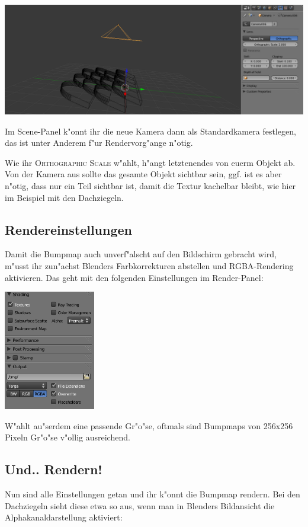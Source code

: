 \documentclass[a4paper]{article}
\newcommand{\ccaption}[1]{\textsc{#1}}
\begin{document}
\begin{center}
\includegraphics[width=150mm]{../images/blender/bumpmap-camera.png}
\end{center}

Im Scene-Panel k"onnt ihr die neue Kamera dann als Standardkamera festlegen, das ist unter Anderem f"ur Rendervorg"ange n"otig.

Wie ihr \ccaption{Orthographic Scale} w"ahlt, h"angt letztenendes von euerm Objekt ab. Von der Kamera aus sollte das gesamte Objekt sichtbar sein,
ggf. ist es aber n"otig, dass nur ein Teil sichtbar ist, damit die Textur kachelbar bleibt, wie hier im Beispiel mit den Dachziegeln.

\subsection{Rendereinstellungen}
Damit die Bumpmap auch unverf"alscht auf den Bildschirm gebracht wird, m"usst ihr zun"achst Blenders Farbkorrekturen abstellen und RGBA-Rendering
aktivieren. Das geht mit den folgenden Einstellungen im Render-Panel:

\begin{center}
\includegraphics[width=40mm]{../images/blender/bumpmap-render.png}
\end{center}

W"ahlt au"serdem eine passende Gr"o"se, oftmals sind Bumpmaps von 256x256 Pixeln Gr"o"se v"ollig ausreichend.

\subsection{Und.. Rendern!}
Nun sind alle Einstellungen getan und ihr k"onnt die Bumpmap rendern. Bei den Dachziegeln sieht diese etwa so aus, wenn man in Blenders Bildansicht
die Alphakanaldarstellung aktiviert:
\end{document}
